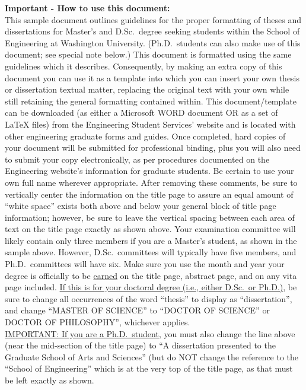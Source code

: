 \begin{extranotespage}
\begin{singlespace}
{ \textbf{Important - How to use this document:}} \\
This sample document outlines guidelines for the proper formatting of theses
and dissertations for Master's and D.Sc.\ degree seeking students within the
School of Engineering at Washington University.  (Ph.D.\ students can also make
use of this document; see special note below.)  This document is formatted
using the same guidelines which it describes.  Consequently, by making an extra
copy of this document you can use it as a template into which you can insert
your own thesis or dissertation textual matter, replacing the original text
with your own while still retaining the general formatting contained within.
This document/template can be downloaded (as either a Microsoft WORD document
OR as a set of \LaTeX{} files) from the Engineering Student Services' website
and is located with other engineering graduate forms and guides.  Once
completed, hard copies of your document will be submitted for professional
binding, plus you will also need to submit your copy electronically, as per
procedures documented on the Engineering website's information for graduate
students.  Be certain to use your own full name wherever appropriate.  After
removing these comments, be sure to vertically center the information on the
title page to assure an equal amount of ``white space'' exists both above and
below your general block of title page information; however, be sure to leave
the vertical spacing between each area of text on the title page exactly as
shown above.  Your examination committee will likely contain only three members
if you are a Master's student, as shown in the sample above.  However, D.Sc.\
committees will typically have five members, and Ph.D.\ committees will have
six.  Make sure you use the month and year your degree is officially to be
\uline{earned} on the title page, abstract page, and on any vita page included.
\uline{If this is for your doctoral degree (i.e., either D.Sc.\ or Ph.D.)}, be
sure to change all occurrences of the word ``thesis'' to display as
``dissertation'', and change ``MASTER OF SCIENCE'' to ``DOCTOR OF SCIENCE'' or
DOCTOR OF PHILOSOPHY'', whichever applies.   \\ \uline{IMPORTANT:  If you are a
Ph.D.\ student}, you must also change the line above (near the mid-section of
the title page) to ``A dissertation presented to the Graduate School of Arts and
Sciences'' (but do NOT change the reference to the ``School of Engineering''
which is at the very top of the title page, as that must be left exactly as shown.


\end{singlespace}
\end{extranotespage}
